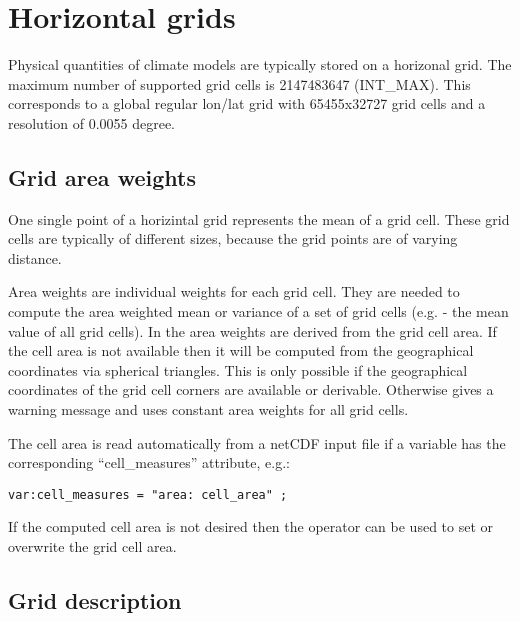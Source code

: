 \section{Horizontal grids}
\label{HORIZONTAL_GRIDS}

Physical quantities of climate models are typically stored on a horizonal grid.
The maximum number of supported grid cells is 2147483647 (INT\_MAX).
This corresponds to a global regular lon/lat grid with 65455x32727
grid cells and a resolution of 0.0055 degree.

\subsection{Grid area weights}
\label{GRID_AREA_WEIGHTS}

One single point of a horizintal grid represents the mean of a grid cell.
These grid cells are typically of different sizes, because the grid points are of varying distance.

Area weights are individual weights for each grid cell. 
They are needed to compute the area weighted mean or
variance of a set of grid cells (e.g.  - the mean value of all grid cells).
In {\CDO} the area weights are derived from the grid cell area.
If the cell area is not available then it will be computed from the geographical coordinates via spherical triangles.
This is only possible if the geographical coordinates of the grid cell corners are available or derivable.
Otherwise {\CDO} gives a warning message and uses constant area weights for all grid cells.

The cell area is read automatically from a netCDF input file if a variable has the
corresponding ``cell\_measures'' attribute, e.g.:

\begin{lstlisting}[frame=single, backgroundcolor=\color{pcolor1}, basicstyle=\small]
var:cell_measures = "area: cell_area" ;
\end{lstlisting}

If the computed cell area is not desired 
then the {\CDO} operator  can be used to
set or overwrite the grid cell area.

\subsection{Grid description}
\label{GRID_DESCRIPTION}

